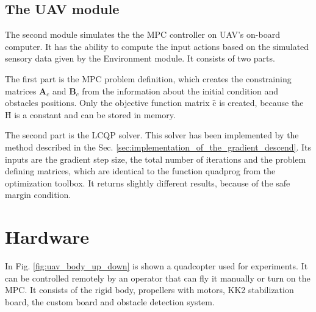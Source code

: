 \documentclass[a4paper,11pt,titlepage]{article}
\newcommand{\macHr}{\textbf{\^H}}
\newcommand{\maccr}{\textbf{\^c}}
\begin{document}
\subsection{The UAV module}

The second module simulates the the MPC controller on UAV's on-board computer. It has the ability to compute the input actions based on the simulated sensory data given by the Environment module. It consists of two parts. 

The first part is the MPC problem definition, which creates the constraining matrices $\textbf{A}_c$ and $\textbf{B}_c$ from the information about the initial condition and obstacles positions. Only the objective function matrix $\maccr$ is created, because the $\macHr$ is a constant and can be stored in memory.

The second part is the LCQP solver. This solver has been implemented by the method described in the Sec. \ref{sec:implementation_of_the_gradient_descend}. Its inputs are the gradient step size, the total number of iterations and the problem defining matrices, which are identical to the function quadprog from the optimization toolbox. It returns slightly different results, because of the safe margin condition. 

\section{Hardware}

In Fig. \ref{fig:uav_body_up_down} is shown a quadcopter used for experiments. It can be controlled remotely by an operator that can fly it manually or turn on the MPC. It consists of the rigid body, propellers with motors, KK2 stabilization board, the custom board and obstacle detection system.
\end{document}

